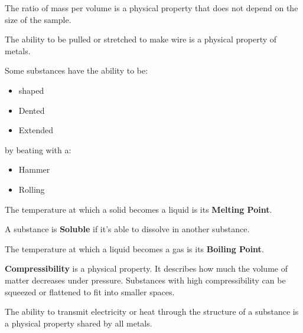 \begin{definition}[Density]
  The ratio of mass per volume is a physical property that does not depend on
  the size of the sample.
\end{definition}

\begin{definition}[Ductility]
  The ability to be pulled or stretched to make wire is a physical property of
  metals.
\end{definition}

\begin{definition}[Malleability]
  Some substances have the ability to be:
  \begin{itemize}
    \item shaped
    \item Dented
    \item Extended
  \end{itemize}

  by beating with a:
  \begin{itemize}
    \item Hammer
    \item Rolling
  \end{itemize}
\end{definition}

\begin{definition}
  The temperature at which a solid becomes a liquid is its \textbf{Melting Point}.
\end{definition}

\begin{definition}[Solubility]
  A substance is \textbf{Soluble} if it's able to dissolve in another substance.
\end{definition}

\begin{definition}
  The temperature at which a liquid becomes a gas is its \textbf{Boiling Point}.
\end{definition}

\begin{definition}[Compressibility]
  \textbf{Compressibility} is a physical property. It describes how much the
  volume of matter decreases under pressure. Substances with high
  compressibility can be squeezed or flattened to fit into smaller spaces.
\end{definition}

\begin{definition}
  The ability to transmit electricity or heat through the structure of a
  substance is a physical property shared by all metals.
\end{definition}

